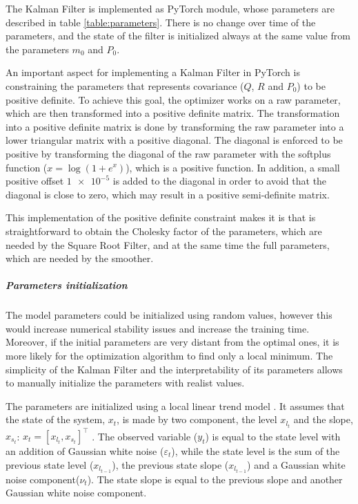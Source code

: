 \documentclass{article}
\begin{document}
The Kalman Filter is implemented as \textsf{PyTorch} module, whose parameters are described in table \ref{table:parameters}.
There is no change over time of the parameters, and the state of the filter is initialized always at the same value from the parameters $m_0$ and $P_0$.


An important aspect for implementing a Kalman Filter in \textsf{PyTorch} is constraining the parameters that represents covariance ($Q$, $R$ and $P_0$) to be positive definite. To achieve this goal, the optimizer works on a raw parameter, which are then transformed into a positive definite matrix.
The transformation into a positive definite matrix is done by transforming the raw parameter into a lower triangular matrix with a positive diagonal. The diagonal is enforced to be positive by transforming the diagonal of the raw parameter with the softplus function ($x = \log (1 + e^{x})$), which is a positive function.
 In addition, a small positive offset $\num{1e-5}$ is added to the diagonal in order to avoid that the diagonal is close to zero, which may result in a positive semi-definite matrix.

This implementation of the positive definite constraint makes it is that is straightforward to obtain the Cholesky factor of the parameters, which are needed by the Square Root Filter, and at the same time the full parameters, which are needed by the smoother.

\subparagraph{Parameters initialization}

The model parameters could be initialized using random values, however this would increase numerical stability issues and increase the training time. Moreover, if the initial parameters are very distant from the optimal ones, it is more likely for the optimization algorithm to find only a local minimum.  The simplicity of the Kalman Filter and the interpretability of its parameters allows to manually initialize the parameters with realist values.

The parameters are initialized using a local linear trend model \cite{durbin_time_2012-1}. It assumes that the state of the system, $x_t$, is made by two component, the level $x_{l_t}$ and the slope, $x_{s_t}$: $x_t = [x_{l_t}, x_{s_t}]^\top$ . The observed variable ($y_t$) is equal to the state level with an addition of Gaussian white noise ($\varepsilon_t$), while the state level is the sum of the previous state level ($x_{l_{t-1}}$), the previous state slope ($x_{l_{t-1}}$) and a Gaussian white noise component($\nu_t$). The state slope is equal to the previous slope and another Gaussian white noise component. 
\end{document}
